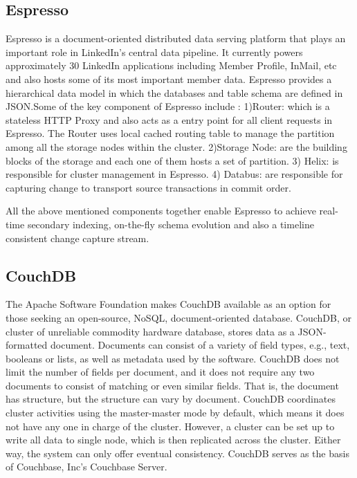 \subsection{Espresso}

     Espresso \cite{www-Linkedin-Espresso} is a document-oriented
     distributed data serving platform that plays an important role in
     LinkedIn's central data pipeline. It currently powers
     approximately 30 LinkedIn applications including Member Profile,
     InMail, etc and also hosts some of its most important member
     data. Espresso provides a hierarchical data model in which the
     databases and table schema are defined in JSON.Some of the key
     component of Espresso include : 1)Router: which is a stateless
     HTTP Proxy and also acts as a entry point for all client requests
     in Espresso. The Router uses local cached routing table to manage
     the partition among all the storage nodes within the
     cluster. 2)Storage Node: are the building blocks of the storage
     and each one of them hosts a set of partition. 3) Helix: is
     responsible for cluster management in Espresso. 4) Databus: are
     responsible for capturing change to transport source transactions
     in commit order.

     All the above mentioned components together enable Espresso to achieve 
     real-time secondary indexing, on-the-fly schema evolution and also a 
     timeline consistent change capture stream.

\subsection{CouchDB}
     
     The Apache Software Foundation makes CouchDB available as an
     option for those seeking an open-source, NoSQL, document-oriented
     database. CouchDB, or cluster of unreliable commodity hardware
     database, \cite{www-exploringcdb-couchdb} stores data as a
     JSON-formatted document.  Documents can consist of a variety of
     field types, e.g., text, booleans or lists, as well as metadata
     used by the software.  \cite{www-techoverview-couchdb} CouchDB
     does not limit the number of fields per document, and it does not
     require any two documents to consist of matching or even similar
     fields.  That is, the document has structure, but the structure
     can vary by document.  CouchDB coordinates cluster activities
     using the master-master mode by default, which means it does not
     have any one in charge of the cluster.  However, a cluster can be
     set up to write all data to single node, which is then replicated
     across the cluster.  Either way, the system can only offer
     eventual consistency.  \cite{www-cdb-vs-cbs-couchdb} CouchDB
     serves as the basis of Couchbase, Inc's Couchbase Server.

